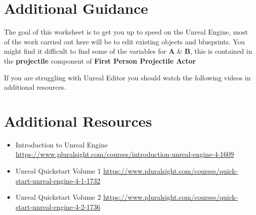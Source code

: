 \documentclass{../../../fal_assignment}
\begin{document}
\section*{Additional Guidance}

The goal of this worksheet is to get you up to speed on the Unreal Engine, most of the work carried out here will be to edit existing objects and blueprints.
You might find it difficult to find some of the variables for \textbf{A} \& \textbf{B}, this is contained in the \textbf{projectile} component
of \textbf{First Person Projectile Actor}

If you are struggling with Unreal Editor you should watch the following videos in additional resources.

\section*{Additional Resources}

\begin{itemize}
    \item Introduction to Unreal Engine \url{https://www.pluralsight.com/courses/introduction-unreal-engine-4-1609}
    \item Unreal Quickstart Volume 1 \url{https://www.pluralsight.com/courses/quick-start-unreal-engine-4-1-1732}
    \item Unreal Quickstart Volume 2 \url{https://www.pluralsight.com/courses/quick-start-unreal-engine-4-2-1736}
     \end{itemize}
\end{document}
